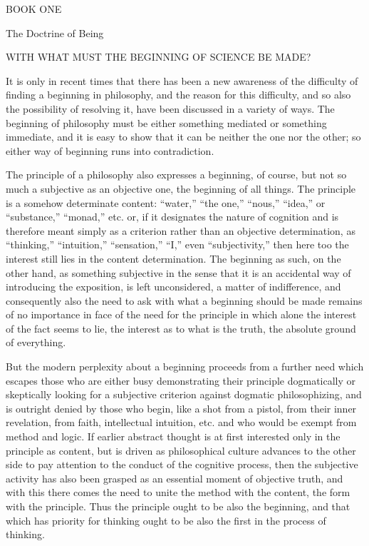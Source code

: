 BOOK ONE

The Doctrine of Being

WITH WHAT MUST THE BEGINNING OF SCIENCE BE MADE?

It is only in recent times that
there has been a new awareness of
the difficulty of finding a beginning in philosophy,
and the reason for this difficulty,
and so also the possibility of resolving it,
have been discussed in a variety of ways.
The beginning of philosophy must be either
something mediated or something immediate,
and it is easy to show that it can be
neither the one nor the other;
so either way of beginning runs into contradiction.

The principle of a philosophy also
expresses a beginning, of course,
but not so much a subjective as an objective one,
the beginning of all things.
The principle is a somehow determinate content:
“water,” “the one,” “nous,” “idea,” or “substance,” “monad,” etc.
or, if it designates the nature of cognition
and is therefore meant simply as a criterion
rather than an objective determination,
as “thinking,” “intuition,” “sensation,” “I,” even “subjectivity,”
then here too the interest still lies in the content determination.
The beginning as such, on the other hand,
as something subjective in the sense that
it is an accidental way of introducing the exposition,
is left unconsidered, a matter of indifference,
and consequently also the need to ask
with what a beginning should be made remains
of no importance in face of the need for the principle
in which alone the interest of the fact seems to lie,
the interest as to what is the truth,
the absolute ground of everything.

But the modern perplexity about a beginning
proceeds from a further need which escapes
those who are either busy demonstrating
their principle dogmatically
or skeptically looking for a subjective criterion
against dogmatic philosophizing,
and is outright denied by those who begin,
like a shot from a pistol,
from their inner revelation,
from faith, intellectual intuition, etc.
and who would be exempt from method and logic.
If earlier abstract thought is at first interested only
in the principle as content,
but is driven as philosophical culture advances
to the other side to pay attention to
the conduct of the cognitive process,
then the subjective activity has also been grasped
as an essential moment of objective truth,
and with this there comes the need to unite
the method with the content,
the form with the principle.
Thus the principle ought to be
also the beginning,
and that which has priority for thinking
ought to be also the first
in the process of thinking.


